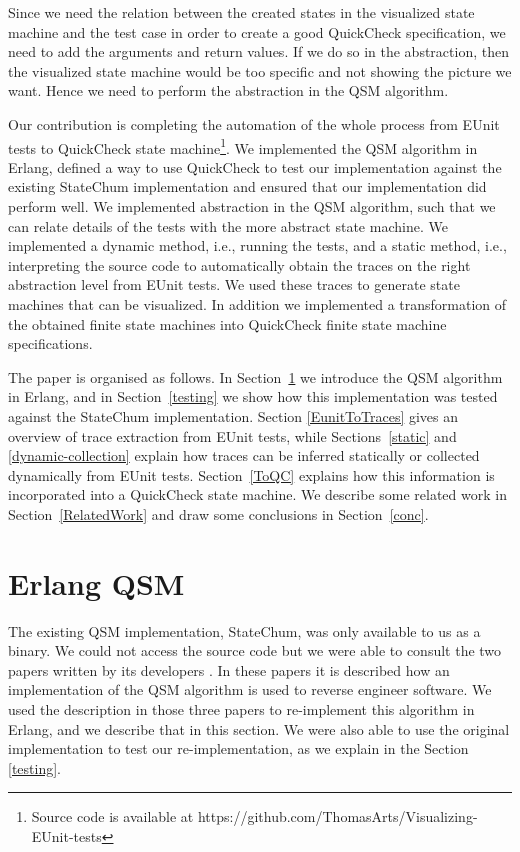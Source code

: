 \documentclass[]{sigplanconf}
\begin{document}
Since we need the relation between the created states in the visualized state machine and the test case in order to create a good QuickCheck specification, we need to add the arguments and return values. If we do so in the abstraction, then the visualized state machine would be too specific and not showing the picture we want. Hence we need to perform the abstraction in the QSM algorithm.

Our contribution is completing the automation of the whole process from EUnit tests to QuickCheck state machine\footnote{Source code is available at  https://github.com/ThomasArts/Visualizing-EUnit-tests}. We implemented the QSM algorithm in Erlang, defined a way to use QuickCheck to test our implementation against the existing StateChum implementation and ensured that our implementation did perform well. We implemented abstraction in the QSM algorithm, such that we can relate details of the tests with the more abstract state machine. We implemented a dynamic method, i.e., running the tests, and a static method, i.e., interpreting the source code to automatically obtain the traces on the right abstraction level from EUnit tests. We used these traces to generate state machines that can be visualized. In addition we implemented
a transformation of the obtained finite state machines into QuickCheck finite state machine specifications.

The paper is organised as follows. In Section~\ref{QSM} we introduce the QSM algorithm in Erlang, and in Section~\ref{testing} we show how this implementation was tested against the StateChum implementation. Section \ref{EunitToTraces} gives an overview of trace extraction from EUnit tests, while Sections~\ref{static} and \ref{dynamic-collection} explain how traces can be inferred statically or collected dynamically from EUnit tests. Section~\ref{ToQC} explains how this information is incorporated into a QuickCheck state machine. We describe some related work in Section~\ref{RelatedWork} and draw some conclusions in Section~\ref{conc}.

\section{Erlang QSM}
\label{QSM}

The existing QSM implementation, StateChum, was only available
to us as a binary. We could not access the source code but
we were able to consult the two papers written by its developers
\cite{walkinshaw2008inferring}\cite{walkinshaw2007reverse}.
In these papers it is described how an implementation of
the QSM algorithm \cite{dupont2008qsm} is used to reverse engineer software.
We used the description in those three papers to re-implement this
algorithm in Erlang, and we describe that in this section. We were also able to use the original implementation to test our re-implementation, as we explain in the Section \ref{testing}.
\end{document}
